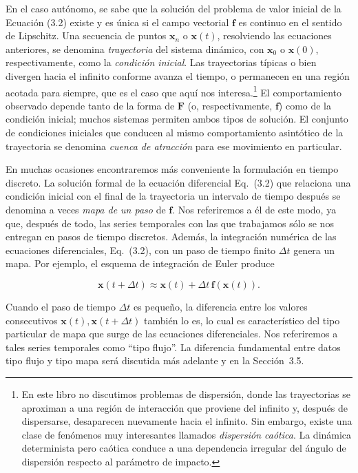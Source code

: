 \documentclass[10pt,a4paper]{book}
\begin{document}
En el caso autónomo, se sabe que la solución del problema de valor inicial de la 
Ecuación (3.2) existe y es única si el campo vectorial $\mathbf{f}$ es continuo en el sentido de Lipschitz.  
Una secuencia de puntos $\mathbf{x}_n$ o $\mathbf{x}(t)$, resolviendo las ecuaciones anteriores, se denomina 
\textit{trayectoria} del sistema dinámico, con $\mathbf{x}_0$ o $\mathbf{x}(0)$, respectivamente, 
como la \textit{condición inicial}.  
Las trayectorias típicas o bien divergen hacia el infinito conforme avanza el tiempo, o permanecen en una región acotada para siempre, que es el caso que aquí nos interesa.\footnote{En este libro no discutimos problemas de dispersión, donde las trayectorias se aproximan a una región de interacción que proviene del infinito y, después de dispersarse, desaparecen nuevamente hacia el infinito. Sin embargo, existe una clase de fenómenos muy interesantes llamados \textit{dispersión caótica}. La dinámica determinista pero caótica conduce a una dependencia irregular del ángulo de dispersión respecto al parámetro de impacto.}  
El comportamiento observado depende tanto de la forma de $\mathbf{F}$ (o, respectivamente, $\mathbf{f}$) como de la condición inicial; muchos sistemas permiten ambos tipos de solución.  
El conjunto de condiciones iniciales que conducen al mismo comportamiento asintótico de la trayectoria se denomina \textit{cuenca de atracción} para ese movimiento en particular.  

En muchas ocasiones encontraremos más conveniente la formulación en tiempo discreto.  
La solución formal de la ecuación diferencial Eq.~(3.2) que relaciona una condición inicial con el final de la trayectoria un intervalo de tiempo después se denomina a veces \textit{mapa de un paso} de $\mathbf{f}$.  
Nos referiremos a él de este modo, ya que, después de todo, las series temporales con las que trabajamos sólo se nos entregan en pasos de tiempo discretos.  
Además, la integración numérica de las ecuaciones diferenciales, Eq.~(3.2), con un paso de tiempo finito $\Delta t$ genera un mapa.  
Por ejemplo, el esquema de integración de Euler produce  

\begin{equation}
\mathbf{x}(t+\Delta t) \approx \mathbf{x}(t) + \Delta t \, \mathbf{f}(\mathbf{x}(t)).
\end{equation}

Cuando el paso de tiempo $\Delta t$ es pequeño, la diferencia entre los valores consecutivos $\mathbf{x}(t), \mathbf{x}(t+\Delta t)$ también lo es, lo cual es característico del tipo particular de mapa que surge de las ecuaciones diferenciales.  
Nos referiremos a tales series temporales como “tipo flujo”.  
La diferencia fundamental entre datos tipo flujo y tipo mapa será discutida más adelante y en la Sección~3.5.
\end{document}
